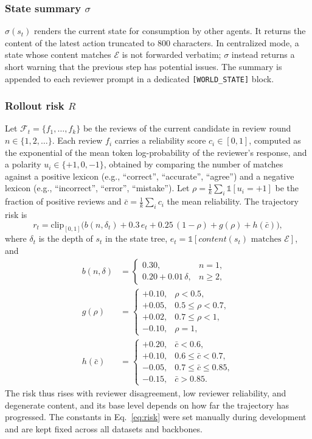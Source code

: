 \subsubsection{State summary \(\sigma\)}
\(\sigma(s_t)\) renders the current state for consumption by other agents. It returns the content of the latest action truncated to 800 characters.
In centralized mode, a state whose content matches \(\mathcal{E}\) is not forwarded verbatim; \(\sigma\) instead returns a short warning that the previous step has potential issues.
The summary is appended to each reviewer prompt in a dedicated \texttt{[WORLD\_STATE]} block.

\subsubsection{Rollout risk \(R\)}
Let \(\mathcal{F}_t=\{f_1,\ldots,f_k\}\) be the reviews of the current candidate in review round \(n\in\{1,2,\ldots\}\).
Each review \(f_i\) carries a reliability score \(c_i\in[0,1]\), computed as the exponential of the mean token log-probability of the reviewer's response, and a polarity \(u_i\in\{+1,0,-1\}\), obtained by comparing the number of matches against a positive lexicon (e.g., ``correct'', ``accurate'', ``agree'') and a negative lexicon (e.g., ``incorrect'', ``error'', ``mistake'').
Let \(\rho = \tfrac{1}{k}\sum_i \mathbb{1}[u_i=+1]\) be the fraction of positive reviews and \(\bar c = \tfrac1k \sum_i c_i\) the mean reliability.
The trajectory risk is
\begin{equation}
\label{eq:risk}
r_t = \mathrm{clip}_{[0,1]}\Big( b(n,\delta_t) + 0.3\,e_t + 0.25\,(1-\rho) + g(\rho) + h(\bar c) \Big),
\end{equation}
where \(\delta_t\) is the depth of \(s_t\) in the state tree, \(e_t=\mathbb{1}[\mathit{content}(s_t)\text{ matches }\mathcal{E}]\), and
\begin{align*}
b(n,\delta) &= \begin{cases} 0.30, & n = 1,\\ 0.20 + 0.01\,\delta, & n \ge 2, \end{cases}\\
g(\rho) &= \begin{cases} +0.10, & \rho < 0.5,\\ +0.05, & 0.5 \le \rho < 0.7,\\ +0.02, & 0.7 \le \rho < 1,\\ -0.10, & \rho = 1, \end{cases}\\
h(\bar c) &= \begin{cases} +0.20, & \bar c < 0.6,\\ +0.10, & 0.6 \le \bar c < 0.7,\\ -0.05, & 0.7 \le \bar c \le 0.85,\\ -0.15, & \bar c > 0.85. \end{cases}
\end{align*}
The risk thus rises with reviewer disagreement, low reviewer reliability, and degenerate content, and its base level depends on how far the trajectory has progressed.
The constants in Eq.~\eqref{eq:risk} were set manually during development and are kept fixed across all datasets and backbones.

